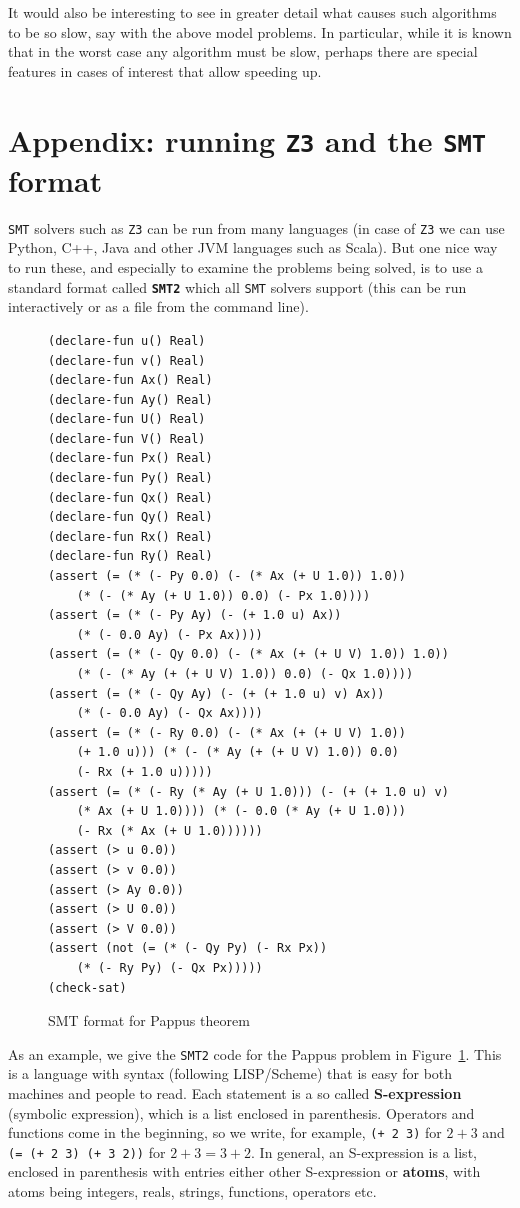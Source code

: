 \documentclass{amsart}
\theoremstyle{plain}
\theoremstyle{definition}
\theoremstyle{remark}
\begin{document}
It would also be interesting to see in greater detail what causes such
algorithms to be so slow, say with the above model problems. In
particular, while it is known that in the worst case any algorithm must
be slow, perhaps there are special features in cases of interest that
allow speeding up.

\section{Appendix: running \texttt{Z3} and the \texttt{SMT} format}

\texttt{SMT} solvers such as \texttt{Z3} can be run from many languages (in case of \texttt{Z3} we
can use Python, C++, Java and other JVM languages such as Scala). But
one nice way to run these, and especially to examine the problems being
solved, is to use a standard format called \textbf{\texttt{SMT2}} which all \texttt{SMT}
solvers support (this can be run interactively or as a file from the
command line).


\begin{figure}
	\begin{lstlisting}[language=LISP, frame=single]
(declare-fun u() Real)
(declare-fun v() Real)
(declare-fun Ax() Real)
(declare-fun Ay() Real)
(declare-fun U() Real)
(declare-fun V() Real)
(declare-fun Px() Real)
(declare-fun Py() Real)
(declare-fun Qx() Real)
(declare-fun Qy() Real)
(declare-fun Rx() Real)
(declare-fun Ry() Real)
(assert (= (* (- Py 0.0) (- (* Ax (+ U 1.0)) 1.0)) 
	(* (- (* Ay (+ U 1.0)) 0.0) (- Px 1.0))))
(assert (= (* (- Py Ay) (- (+ 1.0 u) Ax)) 
	(* (- 0.0 Ay) (- Px Ax))))
(assert (= (* (- Qy 0.0) (- (* Ax (+ (+ U V) 1.0)) 1.0)) 
	(* (- (* Ay (+ (+ U V) 1.0)) 0.0) (- Qx 1.0))))
(assert (= (* (- Qy Ay) (- (+ (+ 1.0 u) v) Ax)) 
	(* (- 0.0 Ay) (- Qx Ax))))
(assert (= (* (- Ry 0.0) (- (* Ax (+ (+ U V) 1.0)) 
	(+ 1.0 u))) (* (- (* Ay (+ (+ U V) 1.0)) 0.0) 
	(- Rx (+ 1.0 u)))))
(assert (= (* (- Ry (* Ay (+ U 1.0))) (- (+ (+ 1.0 u) v) 
	(* Ax (+ U 1.0)))) (* (- 0.0 (* Ay (+ U 1.0))) 
	(- Rx (* Ax (+ U 1.0))))))
(assert (> u 0.0))
(assert (> v 0.0))
(assert (> Ay 0.0))
(assert (> U 0.0))
(assert (> V 0.0))
(assert (not (= (* (- Qy Py) (- Rx Px)) 
	(* (- Ry Py) (- Qx Px)))))
(check-sat)
\end{lstlisting}
	\caption{SMT format for Pappus theorem}\label{smt-pappus}
\end{figure}

As an example, we give the \texttt{SMT2} code for the Pappus problem in Figure~\ref{smt-pappus}. This is a language
with syntax (following LISP/Scheme) that is easy for both machines and
people to read. Each statement is a so called \textbf{S-expression}
(symbolic expression), which is a list enclosed in parenthesis.
Operators and functions come in the beginning, so we write, for example,
\texttt{(+\ 2\ 3)} for \(2 + 3\) and \texttt{(=\ (+\ 2\ 3)\ (+\ 3\ 2))}
for \(2 + 3 = 3 + 2\). In general, an S-expression is a list, enclosed
in parenthesis with entries either other S-expression or \textbf{atoms},
with atoms being integers, reals, strings, functions, operators etc.
\end{document}
